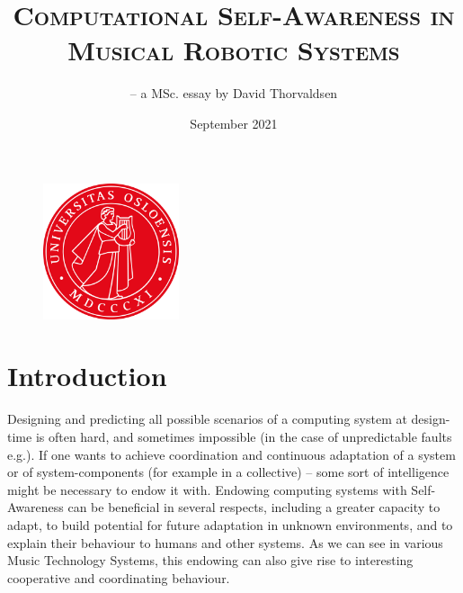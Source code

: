\documentclass{article}
\title{\scshape{Computational Self-Awareness in \\ Musical Robotic Systems}}
\author{-- a MSc. essay by David Thorvaldsen}
\date{September 2021}
\begin{document}


\maketitle

\vfill
\begin{figure}[htp]
\centering
\includegraphics[width = 40mm]{Assets/pics/uio.png}
\end{figure}
\vfill

\newpage

\tableofcontents

\newpage










\section{Introduction}

Designing and predicting all possible scenarios of a computing system at design-time is often hard, and sometimes impossible (in the case of unpredictable faults e.g.). If one wants to achieve coordination and continuous adaptation of a system or of system-components (for example in a collective) -- some sort of intelligence might be necessary to endow it with. Endowing computing systems with Self-Awareness can be beneficial in several respects, including a greater capacity to adapt, to build potential for future adaptation in unknown environments, and to explain their behaviour to humans and other systems. As we can see in various Music Technology Systems, this endowing can also give rise to interesting cooperative and coordinating behaviour.
\end{document}
